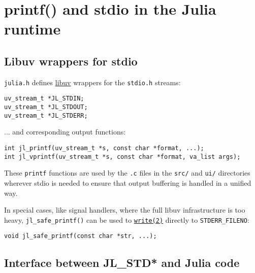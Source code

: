 \hypertarget{12315144918899798229}{}


\section{printf() and stdio in the Julia runtime}



\hypertarget{12808189198177172525}{}


\subsection{Libuv wrappers for stdio}



\texttt{julia.h} defines \href{http://docs.libuv.org}{libuv} wrappers for the \texttt{stdio.h} streams:




\begin{lstlisting}
uv_stream_t *JL_STDIN;
uv_stream_t *JL_STDOUT;
uv_stream_t *JL_STDERR;
\end{lstlisting}



... and corresponding output functions:




\begin{lstlisting}
int jl_printf(uv_stream_t *s, const char *format, ...);
int jl_vprintf(uv_stream_t *s, const char *format, va_list args);
\end{lstlisting}



These \texttt{printf} functions are used by the \texttt{.c} files in the \texttt{src/} and \texttt{ui/} directories wherever stdio is needed to ensure that output buffering is handled in a unified way.



In special cases, like signal handlers, where the full libuv infrastructure is too heavy, \texttt{jl\_safe\_printf()} can be used to \hyperlink{16947913578760238729}{\texttt{write(2)}} directly to \texttt{STDERR\_FILENO}:




\begin{lstlisting}
void jl_safe_printf(const char *str, ...);
\end{lstlisting}



\hypertarget{9919396910097555458}{}


\subsection{Interface between JL\_STD* and Julia code}



